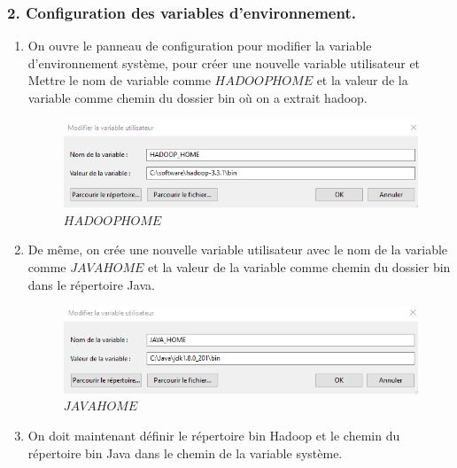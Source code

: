 \subsubsection{2. Configuration des variables d'environnement.}
\begin{enumerate}
\item On ouvre le panneau de configuration pour modifier la variable d'environnement système, pour créer une nouvelle variable utilisateur et Mettre le nom de variable comme $HADOOP HOME$ et la valeur de la variable comme chemin du dossier bin où on a extrait hadoop.
\begin{figure}[h]
	\centering
    \includegraphics[scale=0.6]{img/part3/1.10}
    \caption{$HADOOP HOME$}
\end{figure}

\item De même, on crée une nouvelle variable utilisateur avec le nom de la variable comme $JAVA HOME$ et la valeur de la variable comme chemin du dossier bin dans le répertoire Java.
\begin{figure}[h]
	\centering
    \includegraphics[scale=0.6]{img/part3/1.11}
    \caption{$JAVA HOME$}
\end{figure}

\item On doit maintenant définir le répertoire bin Hadoop et le chemin du répertoire bin Java dans le chemin de la variable système.

\end{enumerate}




























